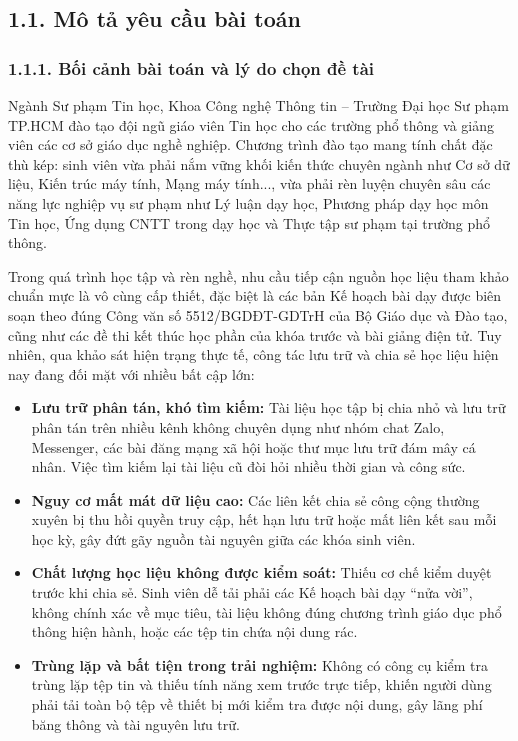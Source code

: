 \subsection{1.1. Mô tả yêu cầu bài toán}

\subsubsection{1.1.1. Bối cảnh bài toán và lý do chọn đề tài}
Ngành Sư phạm Tin học, Khoa Công nghệ Thông tin -- Trường Đại học Sư phạm TP.HCM đào tạo đội ngũ giáo viên Tin học cho các trường phổ thông và giảng viên các cơ sở giáo dục nghề nghiệp. Chương trình đào tạo mang tính chất đặc thù kép: sinh viên vừa phải nắm vững khối kiến thức chuyên ngành như Cơ sở dữ liệu, Kiến trúc máy tính, Mạng máy tính..., vừa phải rèn luyện chuyên sâu các năng lực nghiệp vụ sư phạm như Lý luận dạy học, Phương pháp dạy học môn Tin học, Ứng dụng CNTT trong dạy học và Thực tập sư phạm tại trường phổ thông.

Trong quá trình học tập và rèn nghề, nhu cầu tiếp cận nguồn học liệu tham khảo chuẩn mực là vô cùng cấp thiết, đặc biệt là các bản Kế hoạch bài dạy được biên soạn theo đúng Công văn số 5512/BGDĐT-GDTrH của Bộ Giáo dục và Đào tạo, cũng như các đề thi kết thúc học phần của khóa trước và bài giảng điện tử. Tuy nhiên, qua khảo sát hiện trạng thực tế, công tác lưu trữ và chia sẻ học liệu hiện nay đang đối mặt với nhiều bất cập lớn:
\begin{itemize}[leftmargin=*,noitemsep]
    \item \textbf{Lưu trữ phân tán, khó tìm kiếm:} Tài liệu học tập bị chia nhỏ và lưu trữ phân tán trên nhiều kênh không chuyên dụng như nhóm chat Zalo, Messenger, các bài đăng mạng xã hội hoặc thư mục lưu trữ đám mây cá nhân. Việc tìm kiếm lại tài liệu cũ đòi hỏi nhiều thời gian và công sức.
    \item \textbf{Nguy cơ mất mát dữ liệu cao:} Các liên kết chia sẻ công cộng thường xuyên bị thu hồi quyền truy cập, hết hạn lưu trữ hoặc mất liên kết sau mỗi học kỳ, gây đứt gãy nguồn tài nguyên giữa các khóa sinh viên.
    \item \textbf{Chất lượng học liệu không được kiểm soát:} Thiếu cơ chế kiểm duyệt trước khi chia sẻ. Sinh viên dễ tải phải các Kế hoạch bài dạy ``nửa vời'', không chính xác về mục tiêu, tài liệu không đúng chương trình giáo dục phổ thông hiện hành, hoặc các tệp tin chứa nội dung rác.
    \item \textbf{Trùng lặp và bất tiện trong trải nghiệm:} Không có công cụ kiểm tra trùng lặp tệp tin và thiếu tính năng xem trước trực tiếp, khiến người dùng phải tải toàn bộ tệp về thiết bị mới kiểm tra được nội dung, gây lãng phí băng thông và tài nguyên lưu trữ.
\end{itemize}

